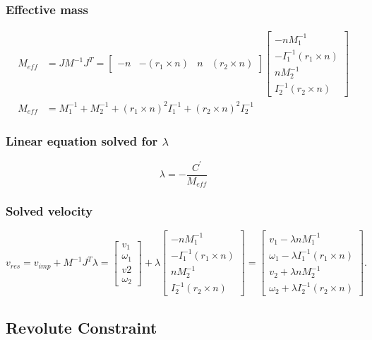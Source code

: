 \documentclass{article}
\begin{document}
	\subsubsection{Effective mass}
	\begin{align}
		M_{eff}&=JM^{-1}J^T=
		\begin{bmatrix}
			-n & -(r_1\times n) & n & (r_2\times n)
		\end{bmatrix}
		\begin{bmatrix}
			-nM_1^{-1}\\
			-I_1^{-1}(r_1\times n)\\
			nM_2^{-1}\\
			I_2^{-1}(r_2\times n)
		\end{bmatrix}\\
		M_{eff}&=M_1^{-1} + M_2^{-1} + (r_1\times n)^2I_1^{-1} + (r_2\times n)^2I_2^{-1}
	\end{align}
	\subsubsection{Linear equation solved for $\lambda$}
		$$
			\lambda=-\frac{C^{'}}{M_{eff}}
		$$
	\subsubsection{Solved velocity}
	$$
		v_{res}=v_{imp}+M^{-1}J^T\lambda=
		\begin{bmatrix}
			v_1\\
			\omega_1\\
			v2\\
			\omega_2
		\end{bmatrix}
		+\lambda
		\begin{bmatrix}
			-nM_1^{-1}\\
			-I_1^{-1}(r_1\times n)\\
			nM_2^{-1}\\
			I_2^{-1}(r_2\times n)
		\end{bmatrix}=
		\begin{bmatrix}
			v_1-\lambda nM_1^{-1}\\
			\omega_1-\lambda I_1^{-1}(r_1\times n)\\
			v_2+\lambda nM_2^{-1}\\
			\omega_2+\lambda I_2^{-1}(r_2\times n)
		\end{bmatrix}.
	$$
	\newpage
	\subsection{Revolute Constraint}
\end{document}
